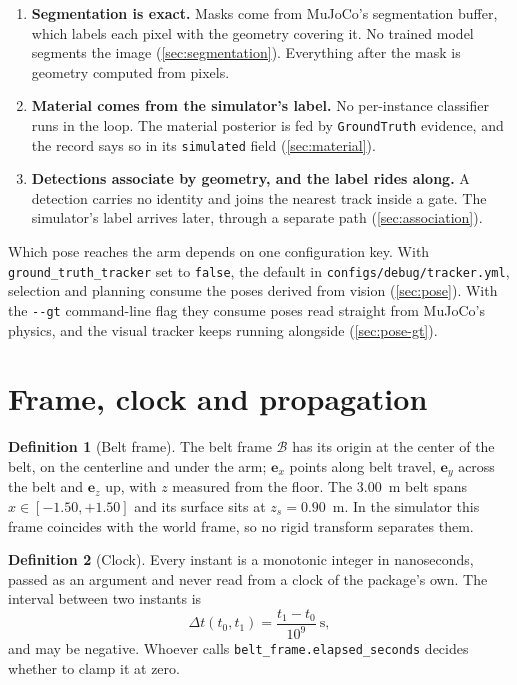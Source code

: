 \documentclass[11pt,a4paper]{article}
\theoremstyle{definition}
\newtheorem{definition}{Definition}
\theoremstyle{remark}
\newcommand{\ex}{\mathbf{e}_x}
\newcommand{\ey}{\mathbf{e}_y}
\newcommand{\ez}{\mathbf{e}_z}
\newcommand{\code}[1]{\texttt{#1}}
\begin{document}
\begin{enumerate}[leftmargin=*]
\item \textbf{Segmentation is exact.} Masks come from MuJoCo's segmentation
  buffer, which labels each pixel with the geometry covering it. No trained
  model segments the image (\cref{sec:segmentation}). Everything after the mask
  is geometry computed from pixels.
\item \textbf{Material comes from the simulator's label.} No per-instance
  classifier runs in the loop. The material posterior is fed by
  \code{GroundTruth} evidence, and the record says so in its \code{simulated}
  field (\cref{sec:material}).
\item \textbf{Detections associate by geometry, and the label rides along.} A
  detection carries no identity and joins the nearest track inside a gate. The
  simulator's label arrives later, through a separate path
  (\cref{sec:association}).
\end{enumerate}

Which pose reaches the arm depends on one configuration key. With
\code{ground\_truth\_tracker} set to \code{false}, the default in
\code{configs/debug/tracker.yml}, selection and planning consume the poses
derived from vision (\cref{sec:pose}). With the \code{-{}-gt} command-line flag
they consume poses read straight from MuJoCo's physics, and the visual tracker
keeps running alongside (\cref{sec:pose-gt}).

\section{Frame, clock and propagation}
\label{sec:frame}

\begin{definition}[Belt frame]
The belt frame $\mathcal{B}$ has its origin at the center of the belt, on the
centerline and under the arm; $\ex$ points along belt travel, $\ey$ across the
belt and $\ez$ up, with $z$ measured from the floor. The 3.00~m belt spans
$x\in[-1.50, +1.50]$ and its surface sits at $z_s = 0.90$~m. In the simulator
this frame coincides with the world frame, so no rigid transform separates them.
\end{definition}

\begin{definition}[Clock]
Every instant is a monotonic integer in nanoseconds, passed as an argument and
never read from a clock of the package's own. The interval between two instants
is
\begin{equation}
\Delta t(t_0,t_1) = \frac{t_1 - t_0}{10^{9}}\ \text{s},
\end{equation}
and may be negative. Whoever calls \code{belt\_frame.elapsed\_seconds}
decides whether to clamp it at zero.
\end{definition}
\end{document}
